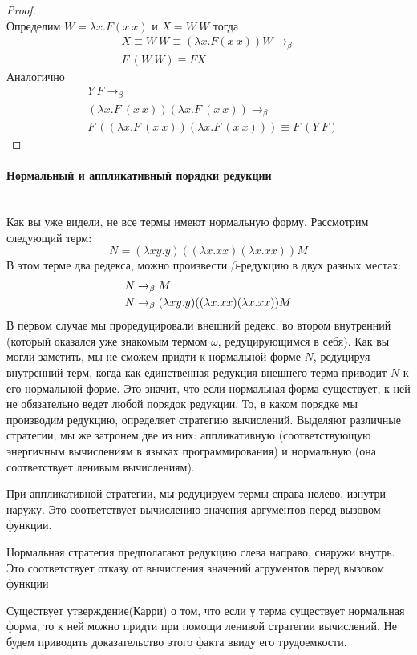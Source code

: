 \documentclass[lambda.tex]{subfiles}
\begin{document}
\begin{proof}~\\
Определим $W = \lambda x.F(x\ x)$ и $X = W\ W$ тогда
\begin{align*}
	X \equiv W\ W \equiv (\lambda x.F(x\ x))W \rightarrow_\beta\\
	F\ (W\ W) \equiv F X
\end{align*}
Аналогично
\begin{align*}
	&Y\ F \rightarrow_\beta\\
	&(\lambda x.F\ (x\ x)) (\lambda x.F\ (x\ x)) \rightarrow_\beta\\
	&F\ ((\lambda x.F\ (x\ x)) (\lambda x.F\ (x\ x))) \equiv F\ (Y\ F)
\end{align*}
\end{proof}

\newpage
\paragraph{Нормальный и аппликативный порядки редукции} %
\label{par:lazy and energic reduction}~\\

Как вы уже видели, не все термы имеют нормальную форму. Рассмотрим следующий терм:
\begin{equation*}
	N = (\lambda x y.y) ((\lambda x.xx)(\lambda x.xx)) M
\end{equation*}
В этом терме два редекса, можно произвести $\beta$-редукцию в двух разных местах:
\begin{align*}
	N &\rightarrow_\beta M\\
	N &\rightarrow_\beta (\lambda x y.y) ((\lambda x.xx)(\lambda x.xx)) M
\end{align*}
В первом случае мы проредуцировали внешний редекс, во втором внутренний (который оказался уже знакомым термом $\omega$, редуцирующимся в себя). Как вы могли заметить, мы не сможем придти к нормальной форме $N$, редуцируя внутренний терм, когда как единственная редукция внешнего терма приводит $N$ к его нормальной форме. Это значит, что если нормальная форма существует, к ней не обязательно ведет любой порядок редукции. То, в каком порядке мы производим редукцию, определяет стратегию вычислений. Выделяют различные стратегии, мы же затронем две из них: аппликативную (соответствующую энергичным вычислениям в языках программирования) и нормальную (она соответствует ленивым вычислениям).

При аппликативной стратегии, мы редуцируем термы справа нелево, изнутри наружу. Это соответствует вычислению значения аргументов перед вызовом функции.

Нормальная стратегия предполагают редукцию слева направо, снаружи внутрь. Это соответствует отказу от вычисления значений агрументов перед вызовом функции

Существует утверждение(Карри) о том, что если у терма существует нормальная форма, то к ней можно придти при помощи ленивой стратегии вычислений. Не будем приводить доказательство этого факта ввиду его трудоемкости. 
\end{document}
